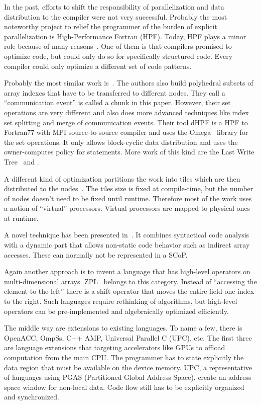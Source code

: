 \documentclass{sigplanconf}
\newcommand{\dquote}[1]{``#1''}
\begin{document}
In the past, efforts to shift the responsibility of parallelization and data distribution to the compiler were not very successful. Probably the most noteworthy project to relief the programmer of the burden of explicit parallelization is High-Performance Fortran (HPF). Today, HPF plays a  minor role because of many reasons~\cite{kennedy07}. One of them is that compilers promised to optimize code, but could only do so for specifically structured code. Every compiler could only optimize a different set of code patterns.

Probably the most similar work is~\cite{adve98}. The authors also build polyhedral subsets of array indexes that have to be transferred to different nodes. They call a \dquote{communication event} is called a chunk in this paper. However, their set operations are very different and also does more advanced techniques like index set splitting and merge of communication events. Their tool dHPF is a HPF to Fortran77 with MPI source-to-source compiler and uses the Omega~\cite{omega} library for the set operations. It only allows block-cyclic data distribution and uses the owner-computes policy for statements. More work of this kind are the Last Write Tree~\cite{amarasinghe93} and \cite{dathathri13}.

A different kind of optimization partitions the work into tiles which are then distributed to the nodes~\cite{bondhugula11,classen06,yuki13}. The tiles size is fixed at compile-time, but the number of nodes doesn't need to be fixed until runtime. Therefore most of the work uses a notion of \dquote{virtual} processors. Virtual processors are mapped to physical ones at runtime.

A novel technique has been presented in~\cite{ravishankar12}. It combines syntactical code analysis with a dynamic part that allows non-static code behavior such as indirect array accesses. These can normally not be represented in a SCoP.

Again another approach is to invent a language that has high-level operators on multi-dimensional arrays. ZPL~\cite{snyder99} belongs to this category. Instead of \dquote{accessing the element to the left} there is a shift operator that moves the entire field one index to the right. Such languages require rethinking of algorithms, but high-level operators can be pre-implemented and algebraically optimized efficiently.

The middle way are extensions to existing languages. To name a few, there is OpenACC, OmpSs, C++ AMP, Universal Parallel C (UPC), etc. The first three are language extensions that targeting accelerators like GPUs to offload computation from the main CPU. The programmer has to state explicitly the data region that must be available on the device memory. UPC, a representative of languages using PGAS (Partitioned Global Address Space), create an address space window for non-local data. Code flow still has to be explicitly organized and synchronized.
\end{document}
